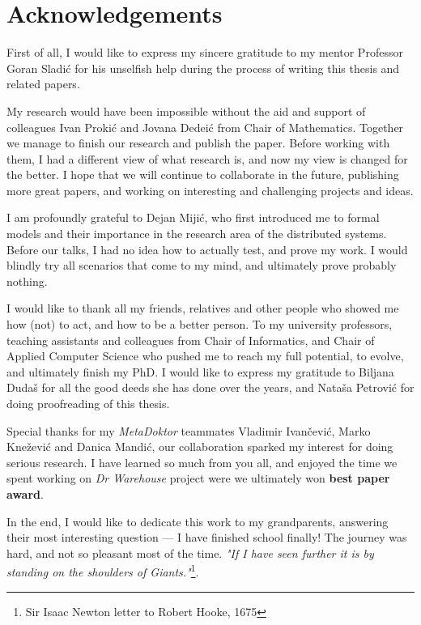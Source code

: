 \chapter*{Acknowledgements}
First of all, I would like to express my sincere gratitude to my mentor Professor Goran Sladi\'c for his unselfish help during the process of writing this thesis and related papers.

My research would have been impossible without the aid and support of colleagues Ivan Proki\'c and Jovana Dedei\'c from Chair of Mathematics. Together we manage to finish our research and publish the paper. Before working with them, I had a different view of what research is, and now my view is changed for the better. I hope that we will continue to collaborate in the future, publishing more great papers, and working on interesting and challenging projects and ideas.

I am profoundly grateful to Dejan Miji\'c, who first introduced me to formal models and their importance in the research area of the distributed systems. Before our talks, I had no idea how to actually test, and prove my work. I would blindly try all scenarios that come to my mind, and ultimately prove probably nothing.

I would like to thank all my friends, relatives and other people who showed me how (not) to act, and how to be a better person. To my university professors, teaching assistants and colleagues from Chair of Informatics, and Chair of Applied Computer Science who pushed me to reach my full potential, to evolve, and ultimately finish my PhD. I would like to express my gratitude to Biljana Duda\v s for all the good deeds she has done over the years, and Nata\v sa Petrovi\'c for doing proofreading of this thesis. 

Special thanks for my \emph{MetaDoktor} teammates Vladimir Ivan\v cevi\'c, Marko Kne\v zevi\'c and Danica Mandi\'c, our collaboration sparked my interest for doing serious research. I have learned so much from you all, and enjoyed the time we spent working on \emph{Dr Warehouse} project were we ultimately won \textbf{best paper award}.

In the end, I would like to dedicate this work to my grandparents, answering their most interesting question --- I have finished school finally! The journey was hard, and not so pleasant most of the time. \emph{"If I have seen further it is by standing on the shoulders of Giants."}\footnote{Sir Isaac Newton letter to Robert Hooke, 1675}.